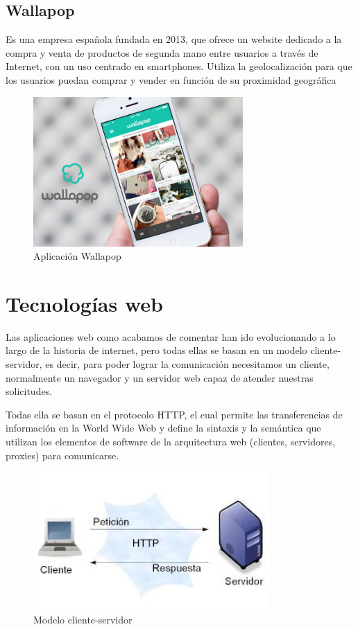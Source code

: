 \subsection*{Wallapop}

Es una empresa española fundada en 2013, que ofrece un website dedicado a la compra y venta de productos de segunda mano entre usuarios a través de Internet, con un uso centrado en smartphones. Utiliza la geolocalización para que los usuarios puedan comprar y vender en función de su proximidad geográfica

\begin{figure}[!h]
    \centering
    \includegraphics[width=80mm]{img/introduccion/Wallapop-iPhone.jpg}
    \caption{Aplicación Wallapop}
\end{figure}


\section{Tecnologías web}

Las aplicaciones web como acabamos de comentar han ido evolucionando a lo largo de la historia de internet, pero todas ellas se basan en un modelo cliente-servidor, es decir, para poder lograr la comunicación necesitamos un cliente, normalmente un navegador y un servidor web capaz de atender nuestras solicitudes.

Todas ella se basan en el protocolo HTTP, el cual permite las transferencias de información en la World Wide Web y define la sintaxis y la semántica que utilizan los elementos de software de la arquitectura web (clientes, servidores, proxies) para comunicarse.

\begin{figure}[!h]
    \centering
    \includegraphics[width=90mm]{img/introduccion/cliente-server.jpeg}
    \caption[Modelo cliente-servidor]{Modelo cliente-servidor}
\end{figure}


